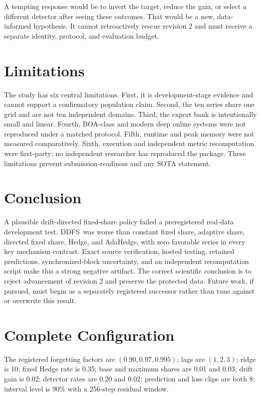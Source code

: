 \documentclass[10pt]{article}
\newcommand{\ddfs}{\textsc{DDFS}}
\begin{document}
A tempting response would be to invert the target, reduce the gain, or select a
different detector after seeing these outcomes. That would be a new, data-informed
hypothesis. It cannot retroactively rescue revision 2 and must receive a separate
identity, protocol, and evaluation budget.

\section{Limitations}

The study has six central limitations. First, it is development-stage evidence and
cannot support a confirmatory population claim. Second, the ten series share one grid
and are not ten independent domains. Third, the expert bank is intentionally small
and linear. Fourth, BOA-class and modern deep online systems were not reproduced
under a matched protocol. Fifth, runtime and peak memory were not measured
comparatively. Sixth, execution and independent metric recomputation were
first-party; no independent researcher has reproduced the package. These limitations
prevent submission-readiness and any SOTA statement.

\section{Conclusion}

A plausible drift-directed fixed-share policy failed a preregistered real-data
development test. \ddfs\ was worse than constant fixed share, adaptive share,
directed fixed share, Hedge, and AdaHedge, with zero favorable series in every key
mechanism contrast. Exact source verification, hosted testing, retained predictions,
synchronized-block uncertainty, and an independent recomputation script make this a
strong negative artifact. The correct scientific conclusion is to reject advancement
of revision 2 and preserve the protected data. Future work, if pursued, must begin as
a separately registered successor rather than tune against or overwrite this result.


\begingroup
\sloppy

\endgroup

\appendix
\section{Complete Configuration}

The registered forgetting factors are $(0.90,0.97,0.995)$; lags are $(1,2,3)$;
ridge is 10; fixed Hedge rate is 0.35; base and maximum shares are 0.01 and 0.03;
drift gain is 0.02; detector rates are 0.20 and 0.02; prediction and loss clips are
both 8; interval level is 90\% with a 256-step residual window.
\end{document}
